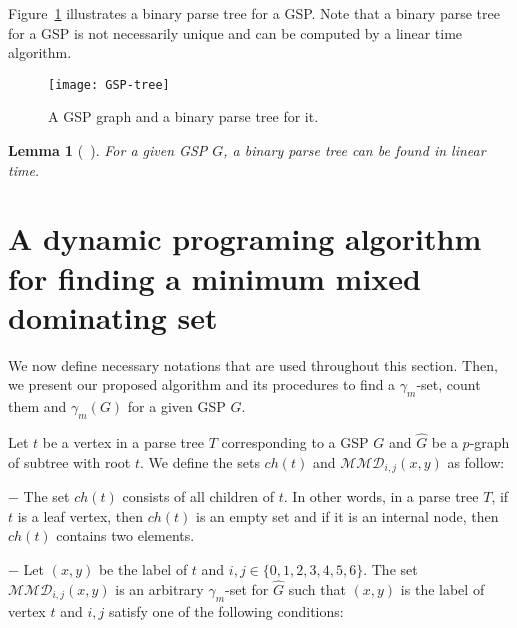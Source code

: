 \documentclass[12pt]{article}
\newtheorem{lemma}[theorem]{Lemma}
\theoremstyle{definition}
\theoremstyle{remark}
\begin{document}
Figure~\ref{parsetree-g} illustrates a binary parse tree for a GSP. Note that a binary parse tree for a GSP is not necessarily unique and can be computed by a linear time algorithm.
\begin{figure}[!h]
	\centering
	\texttt{[image: GSP-tree]}
	\caption{ A GSP graph and a binary parse tree for it.}\label{parsetree-g}
\end{figure}


\begin{lemma}[~\cite{hopcroft1973dividing}]
	For a given  GSP  $G$, a binary parse tree can be found in linear time.
\end{lemma}

\section{A dynamic programing algorithm for finding a minimum mixed dominating set}\label{Sec3}
We now define necessary notations that are used throughout this section. Then, we present our proposed algorithm and its procedures to find a $\gamma_{m}$-set, count them and $\gamma_m(G)$ for a given GSP $G$.

Let $t$ be a vertex in a parse tree $T$ corresponding to a GSP $G$ and $\hat{G}$ be a $p$-graph of subtree with root $t$. We define the sets $ch(t)$ and $\mathcal{MMD}_{i,j}(x,y)$ as follow:

$-$ The set $ch(t)$ consists of all children of $t$. In other words, in a  parse tree $T$, if $t$ is a leaf vertex, then  $ch(t)$ is an empty set and if it is an internal node, then $ch(t)$ contains two elements.


$-$ Let $(x,y)$ be the label of $t$ and $i,j \in \{0,1,2,3,4,5,6\}$. The set $\mathcal{MMD}_{i,j}(x,y)$ is an arbitrary $\gamma_m$-set  for $\hat{G}$  such that $(x,y)$ is the label of vertex $t$ and $i,j$ satisfy  one of the following conditions:
\end{document}

